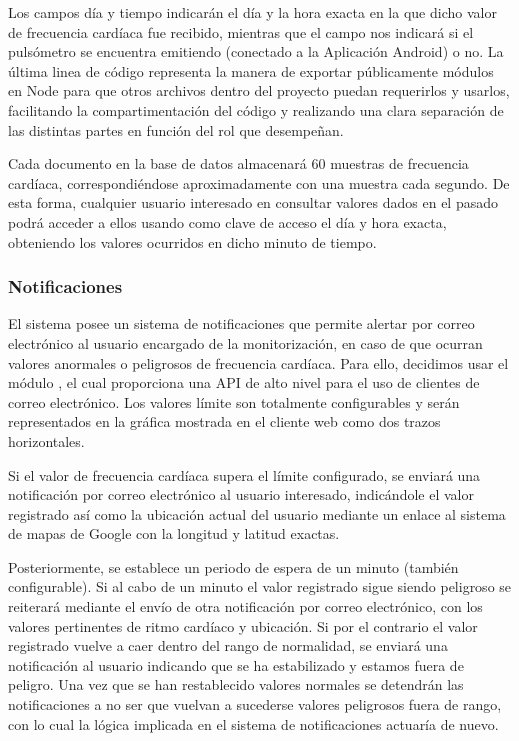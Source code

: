 Los campos día y tiempo indicarán el día y la hora exacta en la que dicho valor de frecuencia cardíaca fue recibido, mientras que el campo  nos indicará si el pulsómetro se encuentra emitiendo (conectado a la Aplicación Android) o no.
La última linea de código  representa la manera de exportar públicamente módulos en Node para que otros archivos dentro del proyecto puedan requerirlos y usarlos, facilitando la compartimentación del código y realizando una clara separación de las distintas partes en función del rol que desempeñan.

Cada documento en la base de datos almacenará 60 muestras de frecuencia cardíaca, correspondiéndose aproximadamente con una muestra cada segundo. De esta forma, cualquier usuario interesado en consultar valores dados en el pasado podrá acceder a ellos usando como clave de acceso el día y hora exacta, obteniendo los valores ocurridos en dicho minuto de tiempo.

\subsubsection{Notificaciones}
El sistema posee un sistema de notificaciones que permite alertar por correo electrónico al usuario encargado de la monitorización, en caso de que ocurran valores anormales o peligrosos de frecuencia cardíaca. Para ello, decidimos usar el módulo , el cual proporciona una API de alto nivel para el uso de clientes de correo electrónico.
Los valores límite son totalmente configurables y serán representados en la gráfica mostrada en el cliente web como dos trazos horizontales.

Si el valor de frecuencia cardíaca supera el límite configurado, se enviará una notificación por correo electrónico al usuario interesado, indicándole el valor registrado así como la ubicación actual del usuario mediante un enlace al sistema de mapas de Google con la longitud y latitud exactas.

Posteriormente, se establece un periodo de espera de un minuto (también configurable). Si al cabo de un minuto el valor registrado sigue siendo peligroso se reiterará mediante el envío de otra notificación por correo electrónico, con los valores pertinentes de ritmo cardíaco y ubicación. Si por el contrario el valor registrado vuelve a caer dentro del rango de normalidad, se enviará una notificación al usuario indicando que se ha estabilizado y estamos fuera de peligro.
Una vez que se han restablecido valores normales se detendrán las notificaciones a no ser que vuelvan a sucederse valores peligrosos fuera de rango, con lo cual la lógica implicada en el sistema de notificaciones actuaría de nuevo.

